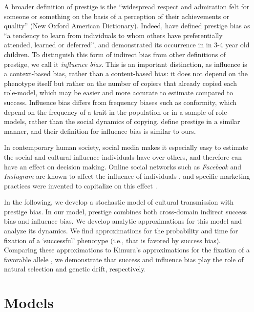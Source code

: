 \documentclass[12pt]{extarticle}
\begin{document}
A broader definition of prestige is the ``widespread respect and admiration felt for someone or something on the basis of a perception of their achievements or quality'' (New Oxford American Dictionary).
Indeed, \citet{prestige_cultural_learning} have defined prestige bias as ``a tendency to learn from individuals to whom others have preferentially attended, learned or deferred'', and demonstrated its occurrence in in 3-4 year old children.
To distinguish this form of indirect bias from other definitions of prestige, we call it \emph{influence bias}. This is an important distinction, as influence is a context-based bias, rather than a content-based bias: it does not depend on the phenotype itself but rather on the number of copiers that already copied each role-model, which may be easier and more accurate to estimate compared to success. Influence bias differs from frequency biases such as conformity, which depend on the frequency of a trait in the population or in a sample of role-models, rather than the social dynamics of copying. \citet{prestige_evolution} define prestige in a similar manner, and their definition for influence bias is similar to ours.

In contemporary human society, social media makes it especially easy to estimate the social and cultural influence individuals have over others, and therefore can have an effect on decision making. Online social networks such as \emph{Facebook} and \emph{Instagram} are known to affect the influence of individuals \citep{social_influence,social_media,influence_analysis}, and specific marketing practices were invented to capitalize on this effect \citep{facebook_marketing}.

In the following, we develop a stochastic model of cultural transmission with prestige bias. In our model, prestige combines both cross-domain indirect success bias and influence bias.
We develop analytic approximations for this model and analyze its dynamics. We find approximations for the probability and time for fixation of a `successful' phenotype (i.e., that is favored by success bias). Comparing these approximations to Kimura's approximations for the fixation of a favorable allele \citep{kimura,kimura_average}, we demonstrate that success and influence bias play the role of natural selection and genetic drift, respectively. 

\section*{Models}
\end{document}
